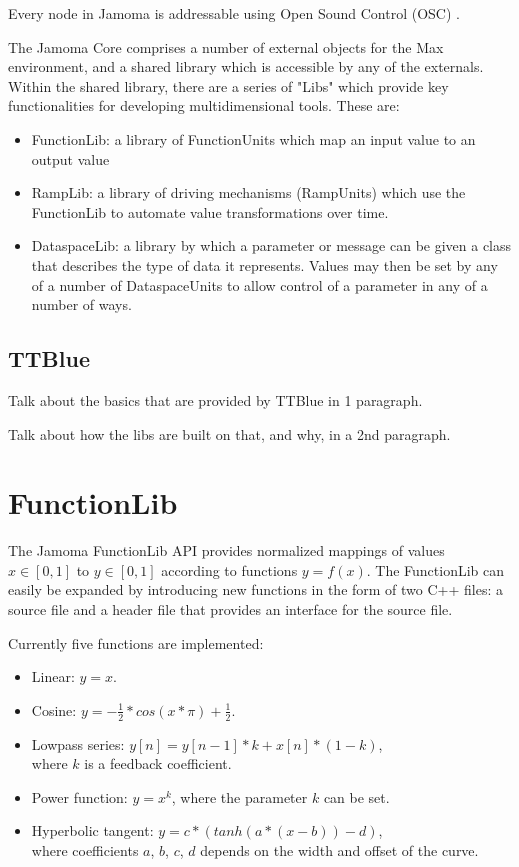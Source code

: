 \documentclass{article}
\begin{document}
Every node in Jamoma is addressable using Open Sound Control (OSC) \cite{Wright:1997}\cite{Wright:2003}. 

The Jamoma Core comprises a number of external objects for the Max \cite{?} environment, and a shared library which is accessible by any of the externals.  Within the shared library, there are a series of "Libs" which provide key functionalities for developing multidimensional tools.  These are:
\begin{itemize}
	\item FunctionLib: a library of FunctionUnits which map an input value to an output value
	\item RampLib: a library of driving mechanisms (RampUnits) which use the FunctionLib to automate value transformations over time.
	\item DataspaceLib: a library by which a parameter or message can be given a class that describes the type of data it represents.  Values may then be set by any of a number of DataspaceUnits to allow control of a parameter in any of a number of ways.
\end{itemize}



\subsection{TTBlue}

Talk about the basics that are provided by TTBlue in 1 paragraph.

Talk about how the libs are built on that, and why, in a 2nd paragraph.




\section{FunctionLib}\label{sec:functionlib}

The Jamoma FunctionLib API provides normalized mappings of values $x \in [0,1]$ to $y \in [0,1]$ according to functions $y = f(x)$. The FunctionLib can easily be expanded by introducing new functions in the form of two C++ files: a source file and a header file that provides an interface for the source file.

Currently five functions are implemented: 

\begin{itemize}
	\item Linear: $y = x$.
	\item Cosine: $y = - \frac{1}{2} * cos(x * \pi ) + \frac{1}{2} $.
	\item Lowpass series: $y[n] = y[n-1] * k + x[n] * (1-k)$, \\ where $k$ is a feedback coefficient.
	\item Power function: $ y = x^{k} $, where the parameter $k$ can be set.
	\item Hyperbolic tangent: $ y = c * (tanh(a*(x-b)) - d) $, \\ where coefficients $a$, $b$, $c$, $d$ depends on the width and offset of the curve.
\end{itemize}
\end{document}
